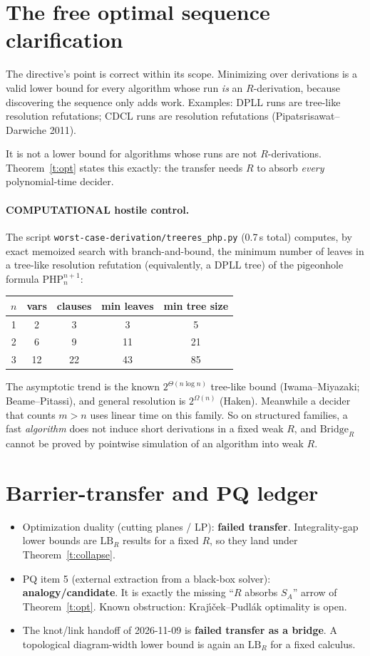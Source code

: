 \documentclass[11pt]{article}
\theoremstyle{definition}
\begin{document}
\section{The free optimal sequence clarification}
The directive's point is correct within its scope. Minimizing over derivations is a valid
lower bound for every algorithm whose run \emph{is} an $R$-derivation, because discovering
the sequence only adds work. Examples: DPLL runs are tree-like resolution refutations;
CDCL runs are resolution refutations (Pipatsrisawat--Darwiche 2011).

It is not a lower bound for algorithms whose runs are not $R$-derivations. Theorem~\ref{t:opt}
states this exactly: the transfer needs $R$ to absorb \emph{every} polynomial-time decider.

\paragraph{COMPUTATIONAL hostile control.} The script \texttt{worst-case-derivation/treeres\_php.py}
(0.7\,s total) computes, by exact memoized search with branch-and-bound, the minimum number of
leaves in a tree-like resolution refutation (equivalently, a DPLL tree) of the pigeonhole
formula $\mathrm{PHP}_n^{n+1}$:
\begin{center}
\begin{tabular}{ccccc}
$n$ & vars & clauses & min leaves & min tree size\\\hline
1&2&3&3&5\\ 2&6&9&11&21\\ 3&12&22&43&85
\end{tabular}
\end{center}
The asymptotic trend is the known $2^{\Theta(n\log n)}$ tree-like bound (Iwama--Miyazaki;
Beame--Pitassi), and general resolution is $2^{\Omega(n)}$ (Haken). Meanwhile a decider that
counts $m>n$ uses linear time on this family. So on structured families, a fast
\emph{algorithm} does not induce short derivations in a fixed weak $R$, and $\mathrm{Bridge}_R$
cannot be proved by pointwise simulation of an algorithm into weak $R$.

\section{Barrier-transfer and PQ ledger}
\begin{itemize}
\item Optimization duality (cutting planes / LP): \textbf{failed transfer}. Integrality-gap lower
bounds are $\mathrm{LB}_R$ results for a fixed $R$, so they land under Theorem~\ref{t:collapse}.
\item PQ item 5 (external extraction from a black-box solver): \textbf{analogy/candidate}. It is
exactly the missing ``$R$ absorbs $S_A$'' arrow of Theorem~\ref{t:opt}. Known obstruction:
Kraj\'{\i}\v{c}ek--Pudl\'ak optimality is open.
\item The knot/link handoff of 2026-11-09 is \textbf{failed transfer as a bridge}. A topological
diagram-width lower bound is again an $\mathrm{LB}_R$ for a fixed calculus.
\end{itemize}
\end{document}
